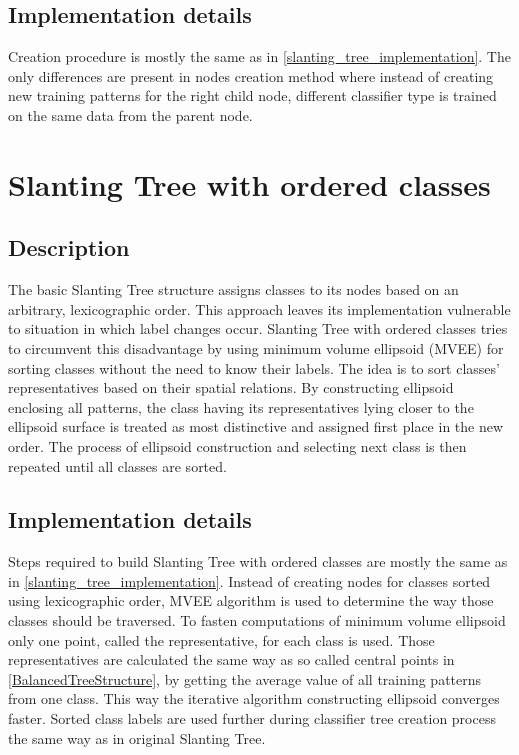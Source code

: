 \subsection{Implementation details}

Creation procedure is mostly the same as in \ref{slanting_tree_implementation}. The only differences are present in nodes creation method where instead of creating new training patterns for the right child node, different classifier type is trained on the same data from the parent node.

\section{Slanting Tree with ordered classes}

\subsection{Description}

The basic Slanting Tree structure assigns classes to its nodes based on an arbitrary, lexicographic order. This approach leaves its implementation vulnerable to situation in which label changes occur. Slanting Tree with ordered classes tries to circumvent this disadvantage by using minimum volume ellipsoid (MVEE)\cite{MVEEMichaelTodd2005} for sorting classes without the need to know their labels. The idea is to sort classes' representatives based on their spatial relations. By constructing ellipsoid enclosing all patterns, the class having its representatives lying closer to the ellipsoid surface is treated as most distinctive and assigned first place in the new order. The process of ellipsoid construction and selecting next class is then repeated until all classes are sorted.

\subsection{Implementation details}

Steps required to build Slanting Tree with ordered classes are mostly the same as in \ref{slanting_tree_implementation}. Instead of creating nodes for classes sorted using lexicographic order, MVEE algorithm is used to determine the way those classes should be traversed. To fasten computations of minimum volume ellipsoid only one point, called the representative, for each class is used. Those representatives are calculated the same way as so called central points in \ref{BalancedTreeStructure}, by getting the average value of all training patterns from one class. This way the iterative algorithm constructing ellipsoid converges faster. Sorted class labels are used further during classifier tree creation process the same way as in original Slanting Tree.

